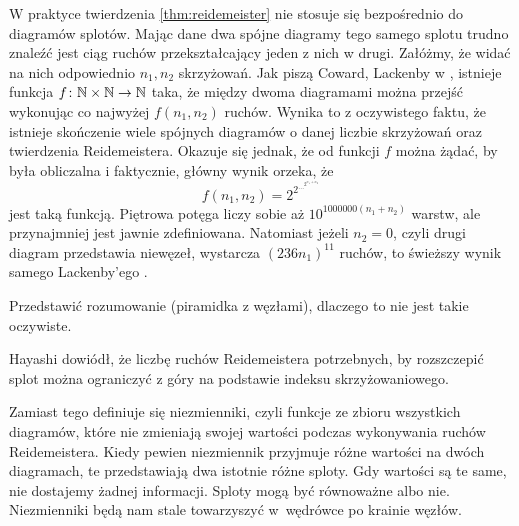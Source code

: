 W praktyce twierdzenia \ref{thm:reidemeister} nie stosuje się bezpośrednio do diagramów splotów.
Mając dane dwa spójne diagramy tego samego splotu trudno znaleźć jest ciąg ruchów przekształcający jeden z nich w drugi.
Załóżmy, że widać na nich odpowiednio $n_1, n_2$ skrzyżowań.
Jak piszą Coward, Lackenby w \cite{coward11}, istnieje funkcja $f \colon \mathbb N \times \mathbb N \to \mathbb N$ taka, że między dwoma diagramami można przejść wykonując co najwyżej $f(n_1, n_2)$ ruchów.
%
%
Wynika to z oczywistego faktu, że istnieje skończenie wiele spójnych diagramów o danej liczbie skrzyżowań oraz twierdzenia Reidemeistera.
Okazuje się jednak, że od funkcji $f$ można żądać, by była obliczalna i faktycznie, główny wynik \cite{coward11} orzeka, że
\begin{equation}
    f(n_1, n_2) = 2^{2^{\ldots^{2^{n_1 + n_2}}}}
\end{equation}
jest taką funkcją.
Piętrowa potęga liczy sobie aż $10^{1000000 (n_1 + n_2)}$ warstw, ale przynajmniej jest jawnie zdefiniowana.
Natomiast jeżeli $n_2 = 0$, czyli drugi diagram przedstawia niewęzeł, wystarcza $(236n_1)^{11}$ ruchów, to świeższy wynik samego Lackenby'ego \cite{lackenby15}.

\begin{tobedone}
    Przedstawić rozumowanie (piramidka z węzłami), dlaczego to nie jest takie oczywiste.
\end{tobedone}

Hayashi \cite{hayashi05} dowiódł, że liczbę ruchów Reidemeistera potrzebnych, by rozszczepić splot można ograniczyć z góry na podstawie indeksu skrzyżowaniowego.
%

Zamiast tego definiuje się niezmienniki, czyli funkcje ze zbioru wszystkich diagramów, które nie zmieniają swojej wartości podczas wykonywania ruchów Reidemeistera.
Kiedy pewien niezmiennik przyjmuje różne wartości na dwóch diagramach, te przedstawiają dwa istotnie różne sploty.
Gdy wartości są te same, nie dostajemy żadnej informacji.
Sploty mogą być równoważne albo nie.
Niezmienniki będą nam stale towarzyszyć w~wędrówce po krainie węzłów.


